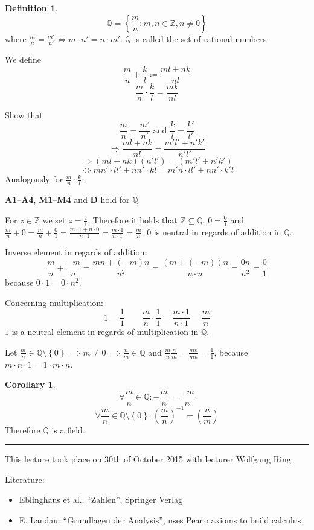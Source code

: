 \documentclass[a4paper,landscape,twocolumn]{article}
\theoremstyle{definition}
\newtheorem{defi}{Definition}
\newtheorem{cor}{Corollary}
\newcommand\set[1]{\left\{#1\right\}}
\newcommand\meta[3]{\hrule{} This #1 took place on #2 with lecturer #3.\par}
\begin{document}
\begin{defi}
  \[ \mathbb{Q} = \set{\frac mn: m,n \in \mathbb{Z}, n \neq 0} \]
  where $\frac mn = \frac{m'}{n'} \Leftrightarrow m \cdot n' = n \cdot m'$.
  $\mathbb{Q}$ is called the set of rational numbers.

  We define
  \[ \frac mn + \frac kl \coloneqq \frac{ml + nk}{nl} \]
  \[ \frac mn \cdot \frac kl = \frac{mk}{nl} \]

  Show that
  \[ \frac mn = \frac{m'}{n'} \text{ and } \frac kl = \frac{k'}{l'} \]
  \[ \Rightarrow \frac{ml + nk}{nl} = \frac{m'l' + n'k'}{n'l'} \]
  \[ \Rightarrow (ml + nk)(n' l') = (m' l' + n' k') \]
  \[ \Leftrightarrow mn' \cdot ll' + nn' \cdot kl = m'n \cdot ll' + nn' \cdot k' l \]
  Analogously for $\frac mn \cdot \frac kl$.

  \textbf{A1}--\textbf{A4}, \textbf{M1}--\textbf{M4} and \textbf{D} hold for $\mathbb{Q}$.

  For $z \in \mathbb{Z}$ we set $z = \frac z1$.
  Therefore it holds that $\mathbb{Z} \subseteq \mathbb{Q}$.
  $0 = \frac 01$ and $\frac mn + 0 = \frac mn + \frac 01 = \frac{m\cdot 1 + n\cdot 0}{n\cdot 1} = \frac{m \cdot 1}{n\cdot 1} = \frac mn$.
  $0$ is neutral in regards of addition in $\mathbb{Q}$.

  Inverse element in regards of addition:
  \[ \frac mn + \frac{-m}n = \frac{mn + (-m)n}{n^2} = \frac{(m + (-m)) n}{n \cdot n} = \frac{0n}{n^2} = \frac 01 \]
  because $0 \cdot 1 = 0 \cdot n^2$.

  Concerning multiplication:
  \[ 1 = \frac 11 \qquad \frac mn \cdot \frac 11 = \frac{m\cdot 1}{n\cdot 1} = \frac mn \]
  $1$ is a neutral element in regards of multiplication in $\mathbb{Q}$.

  Let $\frac mn \in \mathbb{Q} \setminus \set{0} \implies m \neq 0 \implies \frac nm \in \mathbb{Q}$ and $\frac mn \frac nm = \frac{mn}{mn} = \frac 11$,
  because $m \cdot n \cdot 1 = 1\cdot m \cdot n$.
\end{defi}

\begin{cor}
  \[ \forall \frac mn \in \mathbb{Q}: -\frac mn = \frac{-m}{n} \]
  \[ \forall \frac mn \in \mathbb{Q} \setminus \set{0}: \left(\frac mn\right)^{-1} = \left(\frac nm\right) \]
  Therefore $\mathbb{Q}$ is a field.
\end{cor}

\meta{lecture}{30th of October 2015}{Wolfgang Ring}

Literature:
\begin{itemize}
  \item Eblinghaus et al., \enquote{Zahlen}, Springer Verlag
  \item E. Landau: \enquote{Grundlagen der Analysis}, uses Peano axioms to build calculus
\end{itemize}
\end{document}
